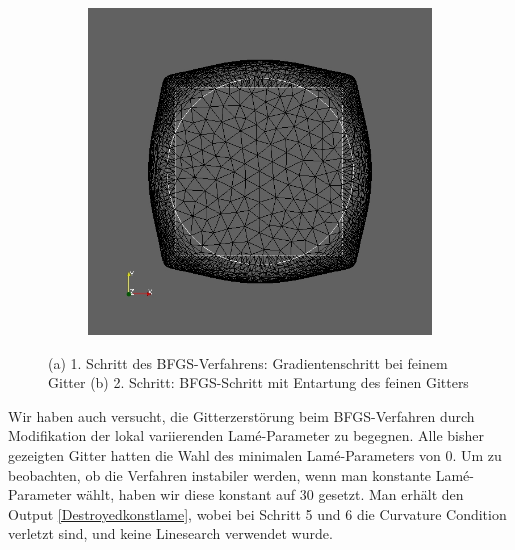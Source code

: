 \begin{figure}
\begin{subfigure}{0.5\textwidth}
	\includegraphics[scale=0.25]{pic_smallcircle_bfgsdestroyed2.jpg}
	\caption{}	
	\end{subfigure}
\caption{(a) 1. Schritt des BFGS-Verfahrens: Gradientenschritt bei feinem Gitter (b) 2. Schritt: BFGS-Schritt mit Entartung des feinen Gitters}
\label{Destroyedbfgs}
\end{figure}

Wir haben auch versucht, die Gitterzerstörung beim BFGS-Verfahren durch Modifikation der lokal variierenden Lamé-Parameter zu begegnen. Alle bisher gezeigten Gitter hatten die Wahl des minimalen Lamé-Parameters von 0. Um zu beobachten, ob die Verfahren instabiler werden, wenn man konstante Lamé-Parameter wählt, haben wir diese konstant auf 30 gesetzt. Man erhält den Output \ref{Destroyedkonstlame}, wobei bei Schritt 5 und 6 die Curvature Condition verletzt sind, und keine Linesearch verwendet wurde.

